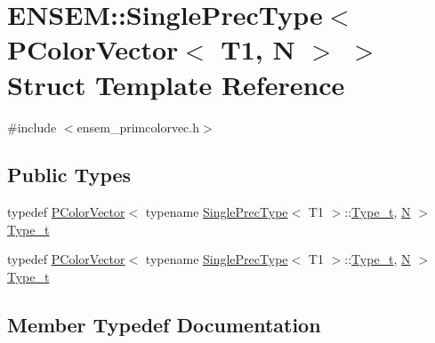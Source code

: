 \hypertarget{structENSEM_1_1SinglePrecType_3_01PColorVector_3_01T1_00_01N_01_4_01_4}{}\section{E\+N\+S\+EM\+:\+:Single\+Prec\+Type$<$ P\+Color\+Vector$<$ T1, N $>$ $>$ Struct Template Reference}
\label{structENSEM_1_1SinglePrecType_3_01PColorVector_3_01T1_00_01N_01_4_01_4}


{\ttfamily \#include $<$ensem\+\_\+primcolorvec.\+h$>$}

\subsection*{Public Types}
\begin{DoxyCompactItemize}
\item 
typedef \mbox{\hyperlink{classENSEM_1_1PColorVector}{P\+Color\+Vector}}$<$ typename \mbox{\hyperlink{structENSEM_1_1SinglePrecType}{Single\+Prec\+Type}}$<$ T1 $>$\+::\mbox{\hyperlink{structENSEM_1_1SinglePrecType_3_01PColorVector_3_01T1_00_01N_01_4_01_4_adbaedd406be0507c332f7676ad81053d}{Type\+\_\+t}}, \mbox{\hyperlink{operator__name__util_8cc_a7722c8ecbb62d99aee7ce68b1752f337}{N}} $>$ \mbox{\hyperlink{structENSEM_1_1SinglePrecType_3_01PColorVector_3_01T1_00_01N_01_4_01_4_adbaedd406be0507c332f7676ad81053d}{Type\+\_\+t}}
\item 
typedef \mbox{\hyperlink{classENSEM_1_1PColorVector}{P\+Color\+Vector}}$<$ typename \mbox{\hyperlink{structENSEM_1_1SinglePrecType}{Single\+Prec\+Type}}$<$ T1 $>$\+::\mbox{\hyperlink{structENSEM_1_1SinglePrecType_3_01PColorVector_3_01T1_00_01N_01_4_01_4_adbaedd406be0507c332f7676ad81053d}{Type\+\_\+t}}, \mbox{\hyperlink{operator__name__util_8cc_a7722c8ecbb62d99aee7ce68b1752f337}{N}} $>$ \mbox{\hyperlink{structENSEM_1_1SinglePrecType_3_01PColorVector_3_01T1_00_01N_01_4_01_4_adbaedd406be0507c332f7676ad81053d}{Type\+\_\+t}}
\end{DoxyCompactItemize}


\subsection{Member Typedef Documentation}
\mbox{\label{structENSEM_1_1SinglePrecType_3_01PColorVector_3_01T1_00_01N_01_4_01_4_adbaedd406be0507c332f7676ad81053d}} 
